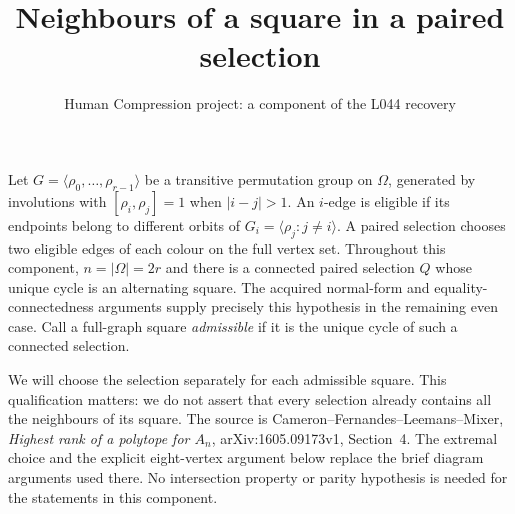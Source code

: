 \documentclass[11pt,a4paper]{article}
\title{Neighbours of a square in a paired selection}
\author{Human Compression project: a component of the L044 recovery}
\date{}
\newcommand{\gen}[1]{\langle#1\rangle}
\begin{document}
\maketitle
Let $G=\gen{\rho_0,\ldots,\rho_{r-1}}$ be a transitive permutation
group on $\Omega$, generated by involutions with
$[\rho_i,\rho_j]=1$ when $|i-j|>1$. An $i$-edge is eligible if its
endpoints belong to different orbits of
$G_i=\gen{\rho_j:j\ne i}$. A paired selection chooses two eligible
edges of each colour on the full vertex set. Throughout this component,
$n=|\Omega|=2r$ and there is a connected paired selection $Q$ whose
unique cycle is an alternating square. The acquired normal-form and
equality-connectedness arguments supply precisely this hypothesis in
the remaining even case. Call a full-graph square \emph{admissible} if
it is the unique cycle of such a connected selection.

We will choose the selection separately for each admissible square.
This qualification matters: we do not assert that every selection
already contains all the neighbours of its square. The source is
Cameron--Fernandes--Leemans--Mixer, \emph{Highest rank of a polytope
for $A_n$}, arXiv:1605.09173v1, Section~4. The extremal choice and
the explicit eight-vertex argument below replace the brief diagram
arguments used there. No intersection property or parity hypothesis
is needed for the statements in this component.
\end{document}
